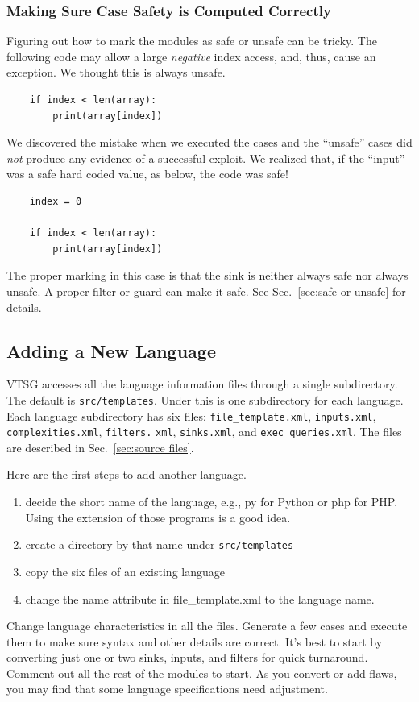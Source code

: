 \subsubsection{Making Sure Case Safety is Computed Correctly}

Figuring out how to mark the modules as safe or unsafe can be tricky.
The following code may allow a large \emph{negative} index access, and, thus, cause an
exception.  We thought this is always unsafe.
\begin{verbatim}
    if index < len(array):
        print(array[index])
\end{verbatim}
We discovered the mistake when we executed the cases and the ``unsafe'' cases did
\emph{not} produce any evidence of a successful exploit.  We realized that, if the
``input'' was a safe hard coded
value, as below, the code was safe!
\begin{verbatim}
    index = 0

    if index < len(array):
        print(array[index])
\end{verbatim}
The proper marking in this case is that the sink is neither always safe nor always unsafe.
A proper filter or guard can make it safe.
See Sec.~\ref{sec:safe or unsafe} for details.

\subsection{Adding a New Language}
\label{sec:add a language}

\label{sec: language directory structure}
VTSG accesses all the language information files through a
single subdirectory.  The default is \verb|src/templates|.  Under this is one
subdirectory for each language.  Each language subdirectory has six files:
\verb|file_template.xml|, \verb|inputs.xml|, \verb|complexities.xml|,
\verb|filters.| \verb|xml|, \verb|sinks.xml|, and \verb|exec_queries.xml|.  The files
are described in Sec.~\ref{sec:source files}.

Here are the first steps to add another language.
\begin{enumerate}[nosep]
\item decide the short name of the language, e.g., py for Python or php for
  PHP.  Using the extension of those programs is a good idea.
\item create a directory by that name under \verb|src/templates|
\item copy the six files of an existing language
\item change the name attribute in file\_template.xml to the language name.
\end{enumerate}
Change language characteristics in all the files.  Generate a few cases and
execute them to make sure syntax and other details are correct.  It's best to
start by converting just one or two sinks, inputs, and filters for quick turnaround.
Comment out all the rest of the modules to start.
As you convert or add flaws, you may find that some language specifications need
adjustment.

